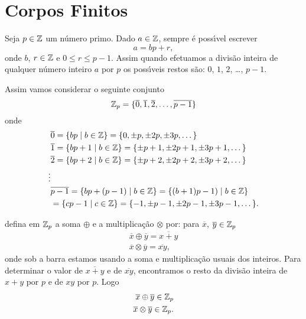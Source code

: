 
\section{Corpos Finitos}\label{sec:corpor_finitos}

Seja $p \in \mathbb{Z}$ um n\'umero primo. Dado $a \in \mathbb{Z}$, sempre \'e poss{\'\i}vel escrever
\[
	a = bp + r,
\]
onde $b$, $r \in \mathbb{Z}$ e $0 \le r \le p - 1$. Assim quando efetuamos a divis\~ao inteira de qualquer n\'umero inteiro $a$ por $p$ os poss{\'\i}veis restos s\~ao: $0$, 
$1$, $2$, \dots, $p -1 $.

Assim vamos considerar o seguinte conjunto
\[
	\mathbb{Z}_p = \{\overline{0}, \overline{1}, \overline{2}, \dots, \overline{p - 1}\}
\]
onde
\begin{align*}
	&\overline{0} = \{bp \mid b \in \mathbb{Z}\} = \{0, \pm p, \pm 2p, \pm 3p, \dots\}\\
	&\overline{1} = \{bp + 1\mid b \in \mathbb{Z}\} = \{\pm p + 1, \pm 2p + 1, \pm 3p + 1, \dots\}\\
	&\overline{2} = \{bp + 2\mid b \in \mathbb{Z}\} = \{\pm p + 2, \pm 2p + 2, \pm 3p + 2, \dots\}\\
	\vdots\\
	&\overline{p - 1} = \{bp + (p - 1) \mid b \in \mathbb{Z}\} = \{(b + 1)p - 1) \mid b \in \mathbb{Z}\}\\ &= \{cp - 1 \mid c \in \mathbb{Z}\} = \{-1, \pm p - 1, \pm 2p - 1, \pm 3p - 1, \dots\}.
\end{align*}

defina em $\mathbb{Z}_p$ a soma $\oplus$ e a multiplica\c{c}\~ao $\otimes$ por: para $\overline{x}$, $\overline{y} \in \mathbb{Z}_p$
\begin{align*}
	\overline{x} \oplus \overline{y} = \overline{x + y}\\
	\overline{x} \otimes \overline{y} = \overline{xy},
\end{align*}
onde sob a barra estamos usando a soma e multiplica\c{c}\~ao usuais dos inteiros. Para determinar o valor de $\overline{x + y}$ e de $\overline{xy}$, encontramos o resto da divis\~ao inteira de $x + y$ por $p$ e de $xy$ por $p$. Logo
\begin{align*}
	\overline{x} \oplus \overline{y} \in \mathbb{Z}_p\\
	\overline{x} \otimes \overline{y} \in \mathbb{Z}_p.
\end{align*}

